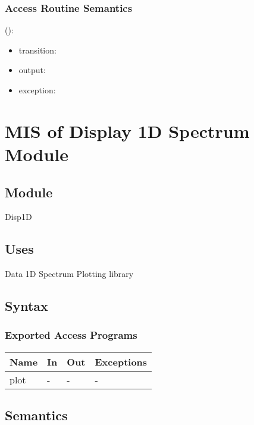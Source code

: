 \documentclass[12pt, titlepage]{article}
\begin{document}
\subsubsection{Access Routine Semantics}

\noindent {}():
\begin{itemize}
\item transition:  
\item output:  
\item exception:  
\end{itemize}

\section{MIS of Display 1D Spectrum Module} \label{Mod:Disp1D}

\subsection{Module}

Disp1D

\subsection{Uses}
Data 1D Spectrum
Plotting library

\subsection{Syntax}

\subsubsection{Exported Access Programs}

\begin{center}
\begin{tabular}{p{2cm} p{4cm} p{4cm} p{2cm}}
\hline
\textbf{Name} & \textbf{In} & \textbf{Out} & \textbf{Exceptions} \\
\hline
plot & - & - & - \\
\hline
\end{tabular}
\end{center}

\subsection{Semantics}
\end{document}
